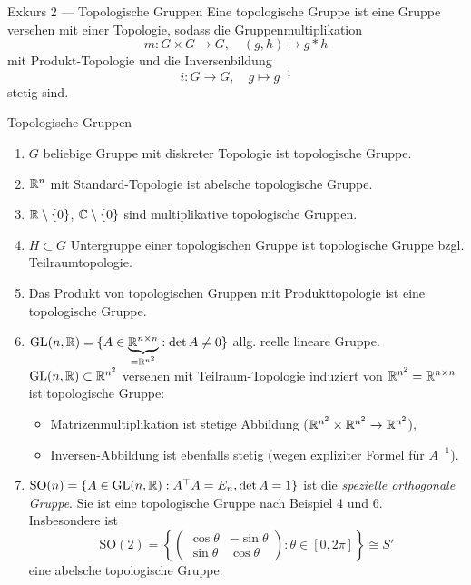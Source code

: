 \begin{bla}{Exkurs 2 --- Topologische Gruppen}
  Eine topologische Gruppe ist eine Gruppe versehen mit einer Topologie, sodass die Gruppenmultiplikation
  \begin{equation*}
    m: G \times G \to G, \quad (g,h) \mapsto g*h
  \end{equation*}
  mit Produkt-Topologie und die Inversenbildung
  \begin{equation*}
    i: G \to G, \quad g \mapsto g^{-1 }
  \end{equation*}
  stetig sind.
\end{bla}

\begin{example}{Topologische Gruppen}
  \begin{enumerate}
    \item $ G $ beliebige Gruppe mit diskreter Topologie ist topologische Gruppe.
    \item $ \mathbb{R}^n $ mit Standard-Topologie ist abelsche topologische Gruppe.
    \item $ \mathbb{R} \setminus \{ 0 \} $, $ \mathbb{C} \setminus \{ 0 \} $ sind multiplikative topologische Gruppen.
    \item $ H \subset G $ Untergruppe einer topologischen Gruppe ist topologische Gruppe bzgl. Teilraumtopologie.
    \item Das Produkt von topologischen Gruppen mit Produkttopologie ist eine topologische Gruppe.
    \item $ \text{GL}(n,\mathbb{R}) = \{ A \in \underbrace{\mathbb{R}^{n \times n}}_{= \mathbb{R}^{n^2}} : \det A \neq 0 \} $ allg. reelle lineare Gruppe. \\
      $ \text{GL}(n,\mathbb{R}) \subset \mathbb{R}^{n^2} $ versehen mit Teilraum-Topologie induziert von $ \mathbb{R}^{n^2} = \mathbb{R}^{n \times n} $ ist topologische Gruppe:
      \begin{itemize}
        \item Matrizenmultiplikation ist stetige Abbildung ($ \mathbb{R}^{n^2} \times \mathbb{R}^{n^2} \to \mathbb{R}^{n^2} $),
        \item Inversen-Abbildung ist ebenfalls stetig (wegen expliziter Formel für $ A^{-1} $).
      \end{itemize}
    \item $ \text{SO}(n) = \{ A \in \text{GL}(n,\mathbb{R}) : A^\top A = E_n, \det A = 1 \} $ ist die \emph{spezielle orthogonale Gruppe}. Sie ist eine topologische Gruppe nach Beispiel 4 und 6. \\
      Insbesondere ist
      \begin{equation*}
        \text{SO}(2) = \left\{ \begin{pmatrix}
          \cos \theta & -\sin \theta \\
          \sin \theta & \cos \theta
        \end{pmatrix} : \theta \in [0, 2\pi] \right\} \cong S'
      \end{equation*}
      eine abelsche topologische Gruppe.
  \end{enumerate}
\end{example}

